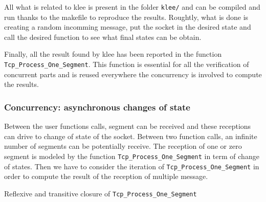 \documentclass[a4paper, 10pt]{article}
\begin{document}
    All what is related to klee is present in the folder \texttt{klee/} and can be compiled and run
    thanks to the makefile to reproduce the results. Roughtly, what is done is creating a random
    incomming message, put the socket in the desired state and call the desired function to see what
    final states can be obtain.

    Finally, all the result found by klee has been reported in the function \lstinline[language=Ada]{Tcp_Process_One_Segment}.
    This function is essential for all the verification of concurrent parts and is reused everywhere
    the concurrency is involved to compute the results.


    

    \subsubsection{Concurrency: asynchronous changes of state}

    Between the user functions calls, segment can be received and these receptions can drive to
    change of state of the socket. Between two function calls, an infinite number of segments
    can be potentially receive. The reception of one or zero segment is modeled by the function
    \lstinline[language=Ada]{Tcp_Process_One_Segment} in term of change of states. Then we have
    to consider the iteration of \lstinline[language=Ada]{Tcp_Process_One_Segment} in order to
    compute the result of the reception of multiple message.

    \begin{algorithm}[t]
        \caption{Reflexive and transitive closure of \lstinline[language=Ada]{Tcp_Process_One_Segment}}
        \label{algo:tcpProcessSegment}
    \end{algorithm}
\end{document}
